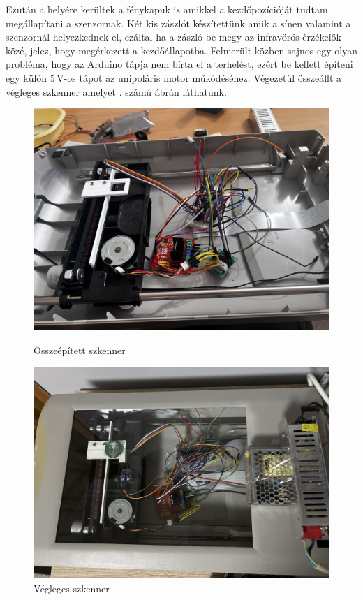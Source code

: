 \documentclass[]{thesis-ekf}
\theoremstyle{definition}
\theoremstyle{remark}
\begin{document}
	Ezután a helyére kerültek a fénykapuk is amikkel a kezdőpozícióját tudtam megállapítani a szenzornak. Két kis zászlót készítettünk amik a sínen valamint a szenzornál helyezkednek el, ezáltal ha a zászló be megy az infravörös érzékelők közé, jelez, hogy megérkezett a kezdőállapotba. Felmerült közben sajnos egy olyan probléma, hogy az Arduino tápja nem bírta el a terhelést, ezért be kellett építeni egy külön 5\,V-os tápot az unipoláris motor működéséhez. Végezetül összeállt a végleges szkenner amelyet . számú ábrán láthatunk.
	
	\begin{figure}[h!]
		\centering
		\begin{minipage}[b]{0.47\textwidth}
			\centering
			\includegraphics[width=\textwidth]{scanner}
			\caption[Összeépített szkenner]{Összeépített szkenner}
			\label{fig:scanner_prototype}
		\end{minipage}
		\hfill
		\begin{minipage}[b]{0.47\textwidth}
			\centering
			\includegraphics[width=\textwidth]{finished_scanner}
			\caption[Végleges szkenner]{Végleges szkenner}
			\label{fig:finishedscanner}
		\end{minipage}
	\end{figure}
	
\end{document}
